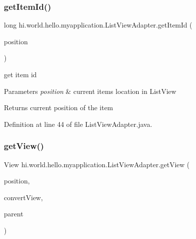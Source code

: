 \subsubsection{\texorpdfstring{getItemId()}{getItemId()}}
{\footnotesize\ttfamily long hi.\+world.\+hello.\+myapplication.\+List\+View\+Adapter.\+get\+Item\+Id (\begin{DoxyParamCaption}\item[{int}]{position }\end{DoxyParamCaption})}



get item id 


\begin{DoxyParams}{Parameters}
{\em position} & current item\textquotesingle{}s location in List\+View \\
\hline
\end{DoxyParams}
\begin{DoxyReturn}{Returns}
current position of the item 
\end{DoxyReturn}


Definition at line 44 of file List\+View\+Adapter.\+java.


\begin{DoxyCode}{0}

\end{DoxyCode}
\mbox{\label{classhi_1_1world_1_1hello_1_1myapplication_1_1_list_view_adapter_a1a3e06698d2fb86b38e6042010dace6a}} 
\subsubsection{\texorpdfstring{getView()}{getView()}}
{\footnotesize\ttfamily View hi.\+world.\+hello.\+myapplication.\+List\+View\+Adapter.\+get\+View (\begin{DoxyParamCaption}\item[{int}]{position,  }\item[{View}]{convert\+View,  }\item[{View\+Group}]{parent }\end{DoxyParamCaption})}



